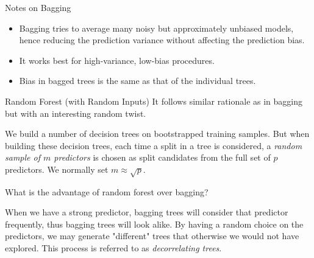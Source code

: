 \documentclass{beamer}
\begin{document}
\begin{frame}{Notes on Bagging}
	\begin{itemize}
		\item Bagging tries to average many noisy but approximately unbiased models, hence reducing the prediction variance without affecting the prediction bias. 
		\item It works best for high-variance, low-bias procedures.
		\item Bias in bagged trees is the same as that of the individual trees.
	\end{itemize}
\end{frame}


\begin{frame}{Random Forest (with Random Inputs)}
	It follows similar rationale as in bagging but with an interesting random twist.
	
	We build a number of decision trees on bootstrapped training samples. But when building these decision trees, each time a split in a tree is considered, a {\it random sample of $m$ predictors} is chosen as split candidates from the full set of $p$ predictors.  We normally set $m\approx \sqrt{p}$.
	
	What is the advantage of random forest over bagging?
	
	When we have a strong predictor, bagging trees will consider that predictor frequently, thus bagging trees will look alike. By having a random choice on the predictors, we may generate "different" trees that otherwise we would not have explored. This process is referred to as {\it decorrelating trees}. 

\end{frame}
\end{document}
